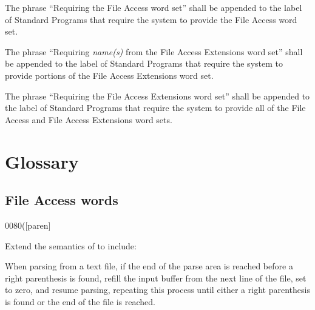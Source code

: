 The phrase ``Requiring the File Access word set'' shall be appended
to the label of Standard Programs that require the system to provide
the File Access word set.

The phrase ``Requiring \emph{name(s)} from the File Access Extensions
word set'' shall be appended to the label of Standard Programs that
require the system to provide portions of the File Access Extensions
word set.

The phrase ``Requiring the File Access Extensions word set'' shall be
appended to the label of Standard Programs that require the system to
provide all of the File Access and File Access Extensions word sets.


\section{Glossary} %

\subsection{File Access words} %

\begin{worddef}[p]{0080}{(}[paren]
\item {}

	Extend the semantics of  to include:

	When parsing from a text file, if the end of the parse area is
	reached before a right parenthesis is found, refill the input
	buffer from the next line of the file, set  to
	zero, and resume parsing, repeating this process until either a
	right parenthesis is found or the end of the file is reached.

	\begin{testing}
	\end{testing}
\end{worddef}


